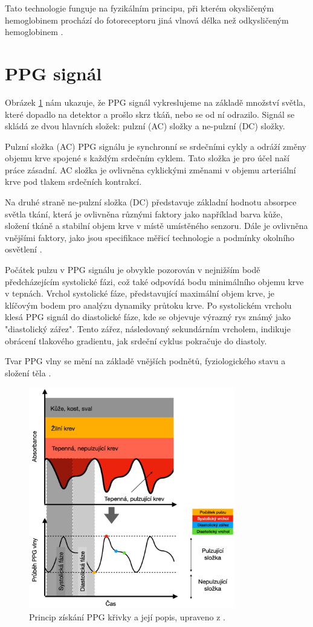 Tato technologie funguje na fyzikálním principu, při kterém okysličeným hemoglobinem prochází do fotoreceptoru jiná vlnová délka než odkysličeným hemoglobinem \cite{Orphanidou2018}.

\section{\acs{PPG} signál}

Obrázek \ref{fig:signalPPG} nám ukazuje, že \acs{PPG} signál vykreslujeme na základě množství světla, které dopadlo na detektor a prošlo skrz tkáň, nebo se od ní odrazilo.
Signál se skládá ze dvou hlavních složek: pulzní (\acs{AC}) složky a ne-pulzní (\acs{DC}) složky.

Pulzní složka (\acs{AC}) \acs{PPG} signálu je synchronní se srdečními cykly a odráží změny objemu krve spojené s každým srdečním cyklem.
Tato složka je pro účel naší práce zásadní.
\acs{AC} složka je ovlivněna cyklickými změnami v objemu arteriální krve pod tlakem srdečních kontrakcí.

Na druhé straně ne-pulzní složka (\acs{DC}) představuje základní hodnotu absorpce světla tkání, která je ovlivněna různými faktory jako například barva kůže, složení tkáně a stabilní objem krve v místě umístěného senzoru.
Dále je ovlivněna vnějšími faktory, jako jsou specifikace měřicí technologie a podmínky okolního osvětlení \cite{ENIKÖ}\cite{Park2022}.

Počátek pulzu v \acs{PPG} signálu je obvykle pozorován v nejnižším bodě předcházejícím systolické fázi, což také odpovídá bodu minimálního objemu krve v tepnách.
Vrchol systolické fáze, představující maximální objem krve, je klíčovým bodem pro analýzu dynamiky průtoku krve.
Po systolickém vrcholu klesá \acs{PPG} signál do diastolické fáze, kde se objevuje výrazný rys známý jako "diastolický zářez".
Tento zářez, následovaný sekundárním vrcholem, indikuje obrácení tlakového gradientu, jak srdeční cyklus pokračuje do diastoly.

Tvar \acs{PPG} vlny se mění na základě vnějších podnětů, fyziologického stavu a složení těla \cite{Park2022}.

\begin{figure}[ht]
	\centering
	\includegraphics[width=0.8\textwidth]{./obrazky/signalPPG.png}
	\caption[Fiziologický popis PPG signálu]{Princip získání \acs{PPG} křivky a její popis, upraveno z \cite{Park2022}.}
	\label{fig:signalPPG}
\end{figure}